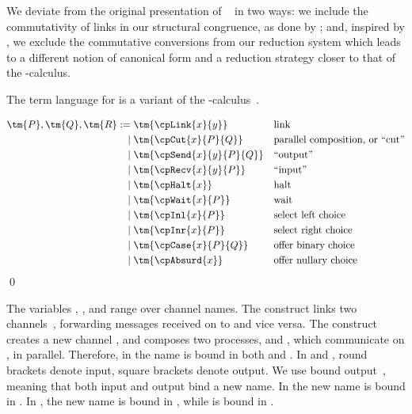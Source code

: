 \documentclass[UKenglish]{llncs}
\begin{document}
We deviate from the original presentation of \cp~\parencite{wadler2012} in two ways:
we include the commutativity of links in our structural congruence, as done by
\textcite{paykin2016}; and, inspired by \textcite{lindley2015semantics}, we
exclude the commutative conversions from our reduction system which leads to a 
different notion of canonical form and a reduction strategy closer to that of
the \textpi-calculus.

The term language for \cp is a variant of the
\textpi-calculus~\parencite{milner1992b}.
\begin{definition}[Terms]\label{def:cp-terms}
  \[\!
    \begin{aligned}
      \tm{P}, \tm{Q}, \tm{R}
           :=& \; \tm{\cpLink{x}{y}}       &&\text{link}
      \\ \mid& \; \tm{\cpCut{x}{P}{Q}}     &&\text{parallel composition, or ``cut''}
      \\ \mid& \; \tm{\cpSend{x}{y}{P}{Q}} &&\text{``output''}
      \\ \mid& \; \tm{\cpRecv{x}{y}{P}}    &&\text{``input''}
      \\ \mid& \; \tm{\cpHalt{x}}          &&\text{halt}
      \\ \mid& \; \tm{\cpWait{x}{P}}       &&\text{wait}
      \\ \mid& \; \tm{\cpInl{x}{P}}        &&\text{select left choice}
      \\ \mid& \; \tm{\cpInr{x}{P}}        &&\text{select right choice}
      \\ \mid& \; \tm{\cpCase{x}{P}{Q}}    &&\text{offer binary choice}
      \\ \mid& \; \tm{\cpAbsurd{x}}        &&\text{offer nullary choice}
    \end{aligned}
  \]  
  \qed
\end{definition}
The variables , ,  and  range over channel names.
The construct  links two
channels~\parencite{sangiorgi1996,boreale1998}, forwarding messages received on
 to  and vice versa.
The construct  creates a new channel , and composes
two processes,  and , which communicate on , in parallel.
Therefore, in  the name  is bound in both  and
.
In  and , round brackets denote
input, square brackets denote output. 
We use bound output~\parencite{sangiorgi1996}, meaning that both input and output
bind a new name. 
In  the new name  is bound in .
In , the new name  is bound in , while
 is bound in .
\end{document}

